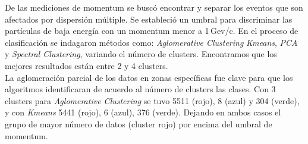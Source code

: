 De las mediciones de momentum se buscó encontrar y separar los eventos que son afectados por dispersión múltiple. Se estableció un umbral para discriminar las partículas de baja energía con un momentum menor a 1\,Gev/c. En el proceso de clasificación se indagaron métodos como: \textit{Aglomerative Clustering} \textit{Kmeans}, \textit{PCA} y \textit{ Spectral Clustering}, variando el número de clusters. Encontramos que los mejores resultados están entre 2 y 4 clusters.\\

La aglomeración parcial de los datos en zonas específicas fue clave para que los algoritmos identificaran de acuerdo al número de clusters las clases. Con 3 clusters para \textit{Aglomerative Clustering} se tuvo 5511 (rojo), 8 (azul) y 304 (verde), y con \textit{Kmeans} 5441 (rojo), 6 (azul),  376 (verde). Dejando en ambos casos el grupo de mayor número de datos (cluster rojo) por encima del umbral de momentum.  



    
    
    
